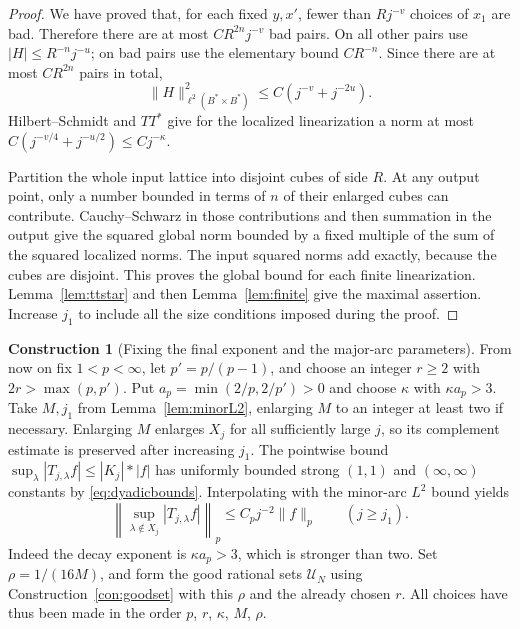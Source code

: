 \documentclass[11pt,oneside]{article}
\theoremstyle{definition}\newtheorem{definition}[theorem]{Definition}
\newtheorem{construction}[theorem]{Construction}
\theoremstyle{remark}\newtheorem{remark}[theorem]{Remark}
\begin{document}
\begin{proof}
We have proved that, for each fixed $y,x'$, fewer than $Rj^{-v}$ choices of
$x_1$ are bad. Therefore there are at most $CR^{2n}j^{-v}$ bad pairs.
On all other pairs use $|H|\leq R^{-n}j^{-u}$; on bad pairs use the elementary
bound $CR^{-n}$. Since there are at most $CR^{2n}$ pairs in total,
\[
 \|H\|_{\ell^2(B^*\times B^*)}^2
       \leq C(j^{-v}+j^{-2u}).
\]
Hilbert--Schmidt and $TT^*$ give for the localized linearization a norm at
most $C(j^{-v/4}+j^{-u/2})\leq Cj^{-\kappa}$.

Partition the whole input lattice into disjoint cubes of side $R$.
At any output point, only a number bounded in terms of $n$ of their enlarged
cubes can contribute. Cauchy--Schwarz in those contributions and then
summation in the output give the squared global norm bounded by a fixed
multiple of the sum of the squared localized norms. The input squared norms
add exactly, because the cubes are disjoint. This proves the global bound
for each finite linearization. Lemma~\ref{lem:ttstar} and then
Lemma~\ref{lem:finite} give the maximal assertion. Increase $j_1$ to include
all the size conditions imposed during the proof.
\end{proof}

\begin{construction}[Fixing the final exponent and the major-arc parameters]\label{con:parameters}
From now on fix $1<p<\infty$, let $p'=p/(p-1)$, and choose an integer
$r\geq2$ with $2r>\max(p,p')$. Put
$a_p=\min(2/p,2/p')>0$ and choose $\kappa$ with $\kappa a_p>3$.
Take $M,j_1$ from Lemma~\ref{lem:minorL2}, enlarging $M$ to an integer at
least two if necessary. Enlarging $M$ enlarges $X_j$ for all sufficiently
large $j$, so its complement estimate is preserved after increasing $j_1$.
The pointwise bound
$\sup_\lambda|T_{j,\lambda}f|\leq |K_j|*|f|$ has uniformly bounded strong
$(1,1)$ and $(\infty,\infty)$ constants by \eqref{eq:dyadicbounds}.
Interpolating with the minor-arc $L^2$ bound yields
\begin{equation}\label{eq:minorp}
 \left\|\sup_{\lambda\notin X_j}|T_{j,\lambda}f|\right\|_p
                 \leq C_pj^{-2}\|f\|_p\qquad(j\geq j_1).
\end{equation}
Indeed the decay exponent is $\kappa a_p>3$, which is stronger than two.
Set $\rho=1/(16M)$, and form the good rational sets $\mathcal U_N$ using
Construction~\ref{con:goodset} with this $\rho$ and the already chosen $r$.
All choices have thus been made in the order $p$, $r$, $\kappa$, $M$, $\rho$.
\end{construction}
\end{document}
